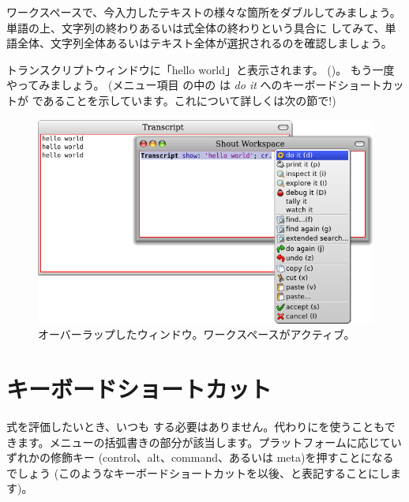 \documentclass[a4paper,10pt,twoside]{book}
\begin{document}
ワークスペースで、今入力したテキストの様々な箇所をダブル\click してみましょう。
単語の上、文字列の終わりあるいは式全体の終わりという具合に \click してみて、単語全体、文字列全体あるいはテキスト全体が選択されるのを確認しましょう。

トランスクリプトウィンドウに「hello world」と表示されます。
()。
もう一度やってみましょう。
(メニュー項目  の中の  は \emph{do it} へのキーボードショートカットが  であることを示しています。これについて詳しくは次の節で!)

\begin{figure}[htb]
\centerline {\includegraphics[width=\textwidth]{HelloWorld}}
\caption{オーバーラップしたウィンドウ。ワークスペースがアクティブ。}
\end{figure}

\section{キーボードショートカット}

式を評価したいとき、いつも \actclick する必要はありません。代わりにを使うこともできます。メニューの括弧書きの部分が該当します。プラットフォームに応じていずれかの修飾キー (control、alt、command、あるいは meta)を押すことになるでしょう
(このようなキーボードショートカットを以後、と表記することにします)。

\end{document}
